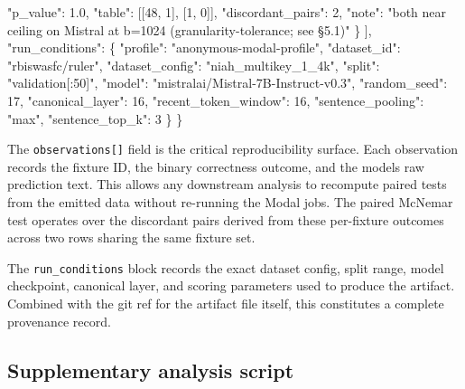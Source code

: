 \documentclass[10pt]{article}
\newenvironment{Shaded}{}{}
\newcommand{\DataTypeTok}[1]{\textcolor[rgb]{0.56,0.13,0.00}{#1}}
\newcommand{\DecValTok}[1]{\textcolor[rgb]{0.25,0.63,0.44}{#1}}
\newcommand{\FloatTok}[1]{\textcolor[rgb]{0.25,0.63,0.44}{#1}}
\newcommand{\FunctionTok}[1]{\textcolor[rgb]{0.02,0.16,0.49}{#1}}
\newcommand{\OtherTok}[1]{\textcolor[rgb]{0.00,0.44,0.13}{#1}}
\newcommand{\StringTok}[1]{\textcolor[rgb]{0.25,0.44,0.63}{#1}}
\begin{document}
\begin{Shaded}
\begin{Highlighting}[]
 \DataTypeTok{"p\_value"}\FunctionTok{:} \FloatTok{1.0}\FunctionTok{,}
 \DataTypeTok{"table"}\FunctionTok{:} \OtherTok{[[}\DecValTok{48}\OtherTok{,} \DecValTok{1}\OtherTok{],} \OtherTok{[}\DecValTok{1}\OtherTok{,} \DecValTok{0}\OtherTok{]]}\FunctionTok{,}
 \DataTypeTok{"discordant\_pairs"}\FunctionTok{:} \DecValTok{2}\FunctionTok{,}
 \DataTypeTok{"note"}\FunctionTok{:} \StringTok{"both near ceiling on Mistral at b=1024 (granularity{-}tolerance; see \S{}5.1)"}
 \FunctionTok{\}}
 \OtherTok{]}\FunctionTok{,}
 \DataTypeTok{"run\_conditions"}\FunctionTok{:} \FunctionTok{\{}
 \DataTypeTok{"profile"}\FunctionTok{:} \StringTok{"anonymous-modal-profile"}\FunctionTok{,}
 \DataTypeTok{"dataset\_id"}\FunctionTok{:} \StringTok{"rbiswasfc/ruler"}\FunctionTok{,}
 \DataTypeTok{"dataset\_config"}\FunctionTok{:} \StringTok{"niah\_multikey\_1\_4k"}\FunctionTok{,}
 \DataTypeTok{"split"}\FunctionTok{:} \StringTok{"validation[:50]"}\FunctionTok{,}
 \DataTypeTok{"model"}\FunctionTok{:} \StringTok{"mistralai/Mistral{-}7B{-}Instruct{-}v0.3"}\FunctionTok{,}
 \DataTypeTok{"random\_seed"}\FunctionTok{:} \DecValTok{17}\FunctionTok{,}
 \DataTypeTok{"canonical\_layer"}\FunctionTok{:} \DecValTok{16}\FunctionTok{,}
 \DataTypeTok{"recent\_token\_window"}\FunctionTok{:} \DecValTok{16}\FunctionTok{,}
 \DataTypeTok{"sentence\_pooling"}\FunctionTok{:} \StringTok{"max"}\FunctionTok{,}
 \DataTypeTok{"sentence\_top\_k"}\FunctionTok{:} \DecValTok{3}
 \FunctionTok{\}}
\FunctionTok{\}}
\end{Highlighting}
\end{Shaded}

The \texttt{observations{[}{]}} field is the critical reproducibility
surface. Each observation records the fixture ID, the binary correctness
outcome, and the model\textquotesingle s raw prediction text. This
allows any downstream analysis to recompute paired tests from the
emitted data without re-running the Modal jobs. The paired McNemar test
operates over the discordant pairs derived from these per-fixture
outcomes across two rows sharing the same fixture set.

The \texttt{run\_conditions} block records the exact dataset config,
split range, model checkpoint, canonical layer, and scoring parameters
used to produce the artifact. Combined with the git ref for the artifact
file itself, this constitutes a complete provenance record.

\subsection{Supplementary analysis script}\label{a3-supplementary-analysis-script}
\end{document}
